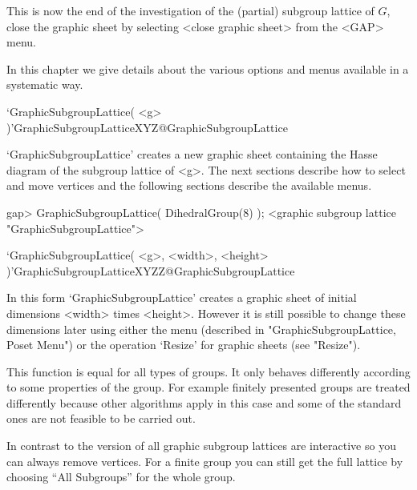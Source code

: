 This is  now   the end  of the investigation   of  the (partial) subgroup
lattice of $G$,  close the graphic  sheet  by selecting <close  graphic
sheet> from the <GAP> menu.



In this chapter we give details about the various options and menus
available in a systematic way.


\>`GraphicSubgroupLattice( <g> )'{GraphicSubgroupLatticeXYZ}@{GraphicSubgroupLattice}

`GraphicSubgroupLattice' creates a new graphic sheet containing the Hasse
diagram of the subgroup lattice of <g>.  The next sections describe
how to select and move vertices and the following sections describe the
available menus.

\begintt
gap> GraphicSubgroupLattice( DihedralGroup(8) );
<graphic subgroup lattice "GraphicSubgroupLattice">
\endtt

\>`GraphicSubgroupLattice( <g>, <width>, <height> )'{GraphicSubgroupLatticeXYZZ}@{GraphicSubgroupLattice}

In this form `GraphicSubgroupLattice' creates a graphic sheet of initial
dimensions <width> times <height>.  However it is still possible to change
these dimensions later using either the menu (described in
"GraphicSubgroupLattice, Poset Menu") or the operation `Resize' for graphic 
sheets (see "Resize").

This function is equal for all types of groups. It only behaves differently
according to some properties of the group. For example finitely presented
groups are treated differently because other algorithms apply in this case
and some of the standard ones are not feasible to be carried out. 

In contrast to the {} version of {\XGAP} all graphic subgroup lattices 
are interactive so you can always remove vertices. For a finite group you 
can still get the full lattice by choosing ``All Subgroups'' for the whole 
group.

%

